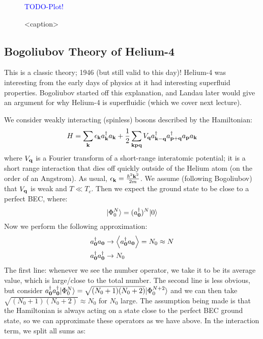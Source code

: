 \begin{figure}[htbp]
    \centering
    \textcolor{blue}{TODO-Plot!}
    \caption{<caption>}
    \label{<label>}
\end{figure}

\subsection{Bogoliubov Theory of Helium-4}
This is a classic theory; 1946 (but still valid to this day)! Helium-4 was interesting from the early days of physics at it had interesting superfluid properties. Bogoliubov started off this explanation, and Landau later would give an argument for why Helium-4 is superfluidic (which we cover next lecture).

We consider weakly interacting (spinless) bosons described by the Hamiltonian:
\begin{equation}
    H = \sum_{\mathbf{k}} \epsilon_{\mathbf{k}}a^{\dagger}_{\mathbf{k}}a_{\mathbf{k}} + \frac{1}{2}\sum_{\mathbf{k}\mathbf{p}\mathbf{q}}V_{\mathbf{q}}a^\dagger_{\mathbf{k} - \mathbf{q}}a^{\dagger}_{\mathbf{p} + \mathbf{q}}a_{\mathbf{p}}a_{\mathbf{k}}
\end{equation}
where $V_{\mathbf{q}}$ is a Fourier transform of a short-range interatomic potential; it is a short range interaction that dies off quickly outside of the Helium atom (on the order of an Angstrom). As usual, $\epsilon_{\mathbf{k}} = \frac{\hbar^2\mathbf{k}^2}{2m}$. We assume (following Bogoliubov) that $V_{\mathbf{q}}$ is weak and $T \ll T_c$. Then we expect the ground state to be close to a perfect BEC, where:
\begin{equation}
    \lvert \Phi^N_0 \rangle = (a^\dagger_{\mathbf{0}})^N\lvert 0 \rangle
\end{equation}
Now we perform the following approximation:
\begin{equation}\label{eq-Napproxbogo}
    \begin{split}
        &a^\dagger_{\mathbf{0}}a_{\mathbf{0}} \to \left< a^\dagger_{\mathbf{0}}a_{\mathbf{0}} \right> = N_0 \approx N
        \\&a^\dagger_{\mathbf{0}}a^\dagger_{\mathbf{0}} \to N_0
    \end{split}
\end{equation}
The first line: whenever we see the number operator, we take it to be its average value, which is large/close to the total number. The second line is less obvious, but consider $a_{\mathbf{0}}^\dagger a_{\mathbf{0}}^\dagger \lvert \Phi_0^N \rangle = \sqrt{(N_0 + 1)(N_0 + 2)}\lvert \Phi_0^{N+2} \rangle$ and we can then take $\sqrt{(N_0 + 1)(N_0 + 2)} \approx N_0$ for $N_0$ large. The assumption being made is that the Hamiltonian is always acting on a state close to the perfect BEC ground state, so we can approximate these operators as we have above. In the interaction term, we split all sums as:
